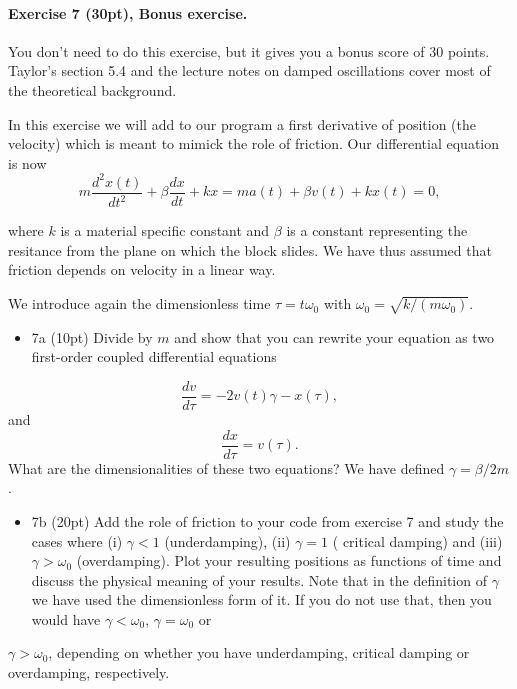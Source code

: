 \documentclass[%
oneside,                 %
final,                   %
10pt]{article}
\begin{document}
\paragraph{Exercise 7 (30pt), Bonus exercise.}
You don't need to do this exercise, but it gives you a bonus score of 30 points. Taylor's section 5.4 and the lecture notes on damped oscillations cover most of the theoretical background.

In this exercise we will add to our program a first derivative of position (the velocity) which is meant to mimick the role of friction.
Our differential equation is now
\[
m\frac{d^2x(t)}{dt^2}+\beta\frac{dx}{dt}+kx=ma(t)+\beta v(t)+kx(t)=0,
\]

where $k$ is a material specific constant and $\beta$ is a constant
representing the resitance from the plane on which the block slides.
We have thus assumed that friction depends on velocity in a linear
way.

We introduce again the dimensionless time $\tau = t\omega_0$ with
$\omega_0=\sqrt{k/(m\omega_0)}$.

\begin{itemize}
\item 7a (10pt) Divide by $m$ and show that you can rewrite your equation as two first-order coupled differential equations
\end{itemize}

\noindent
\[
\frac{dv}{d\tau} = -2v(t)\gamma-x(\tau),
\]
and
\[
\frac{dx}{d\tau} = v(\tau).
\]
What are the dimensionalities of these two equations? We have defined $\gamma = \beta/2m$.  


\begin{itemize}
\item 7b (20pt)  Add the role of friction to your code from exercise 7 and study the cases where (i) $\gamma < 1$ (underdamping), (ii) $\gamma = 1$ ( critical damping) and (iii) $\gamma > \omega_0$ (overdamping). Plot your resulting positions as functions of time and discuss the physical meaning of your results. Note that in the definition of $\gamma$ we have used the dimensionless form of it. If you do not use that, then you would have $\gamma < \omega_0$, $\gamma =\omega_0$ or
\end{itemize}

\noindent
$\gamma > \omega_0$, depending on whether you have underdamping, critical damping or overdamping, respectively.



\end{document}
